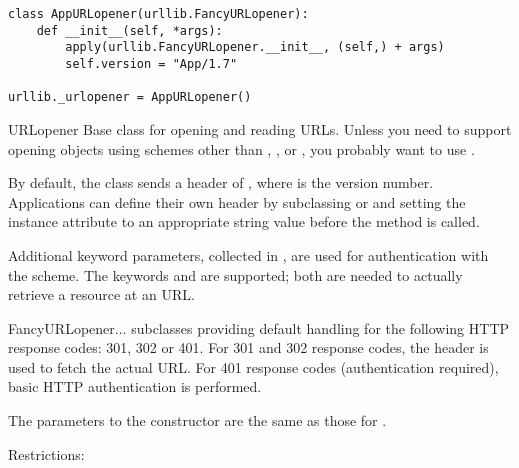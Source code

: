 \begin{verbatim}
class AppURLopener(urllib.FancyURLopener):
    def __init__(self, *args):
        apply(urllib.FancyURLopener.__init__, (self,) + args)
        self.version = "App/1.7"

urllib._urlopener = AppURLopener()
\end{verbatim}

\begin{classdesc}{URLopener}{}
Base class for opening and reading URLs.  Unless you need to support
opening objects using schemes other than , ,
 or , you probably want to use
.

By default, the  class sends a
 header of , where
 is the  version number.  Applications can
define their own  header by subclassing
 or  and setting the instance
attribute  to an appropriate string value before the
 method is called.

Additional keyword parameters, collected in , are used for
authentication with the  scheme.  The keywords
 and  are supported; both are needed to
actually retrieve a resource at an  URL.
\end{classdesc}

\begin{classdesc}{FancyURLopener}{...}
 subclasses  providing default
handling for the following HTTP response codes: 301, 302 or 401.  For
301 and 302 response codes, the  header is used to
fetch the actual URL.  For 401 response codes (authentication
required), basic HTTP authentication is performed.

The parameters to the constructor are the same as those for
.
\end{classdesc}

Restrictions:

